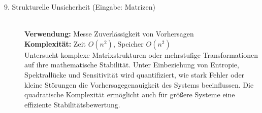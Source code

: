 \documentclass[a4paper,12pt]{article}
\begin{document}
\begin{description}
    \item[9. Strukturelle Unsicherheit (Eingabe: Matrizen)] \hfill \\
    \textbf{Verwendung:} Messe Zuverlässigkeit von Vorhersagen \\
    \textbf{Komplexität:} Zeit $O(n^2)$, Speicher $O(n^2)$ \\
    Untersucht komplexe Matrixstrukturen oder mehrstufige Transformationen auf ihre mathematische Stabilität. Unter Einbeziehung von Entropie, Spektrallücke und Sensitivität wird quantifiziert, wie stark Fehler oder kleine Störungen die Vorhersagegenauigkeit des Systems beeinflussen. Die quadratische Komplexität ermöglicht auch für größere Systeme eine effiziente Stabilitätsbewertung.
\end{description}
    
\end{document}

